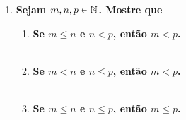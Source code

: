 \begin{enumerate}[wide, labelwidth=!, labelindent=0pt]
  \item \textbf{Sejam $m, n, p \in \mathbb N$. Mostre que}

  \begin{enumerate}[label=\alph*)]
    \item \textbf{Se $m \le n$ e $n < p$, então $m < p$.}\\
    \\
    \item \textbf{Se $m < n$ e $n \le p$, então $m < p$.}\\
    \\
    \item \textbf{Se $m \le n$ e $n \le p$, então $m \le p$.}\\
    \\
  \end{enumerate}
  
\end{enumerate}



